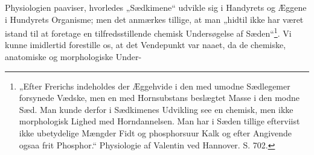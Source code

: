 \documentclass[12pt,a4paper]{book}
\begin{document}
Physiologien paaviser, hvorledes „Sædkimene“ udvikle sig i Handyrets og
Æggene i Hundyrets Organisme; men det anmærkes tillige, at man „hidtil
ikke har været istand til at foretage en tilfredsstillende chemisk
Undersøgelse af Sæden“\footnote{„Efter Frerichs indeholdes der Æggehvide i
den med umodne Sædlegemer forsynede Vædske, men en med Hornsubstans
beslægtet Masse i den modne Sæd. Man kunde derfor i Sædkimenes Udvikling
see en chemisk, men ikke morphologisk Lighed med Horndannelsen. Man har i
Sæden tillige efterviist ikke ubetydelige Mængder Fidt og phosphorsuur
Kalk og efter Angivende ogsaa frit Phosphor.“ Physiologie af Valentin ved
Hannover. S. 702.}. Vi kunne imidlertid forestille os, at det Vendepunkt
var naaet, da de chemiske, anatomiske og morphologiske Under-
\end{document}
